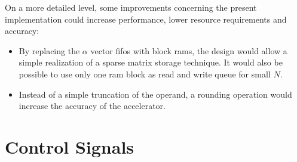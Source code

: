 \documentclass[mscthesis]{usiinfthesis}
\begin{document}
On a more detailed level, some improvements concerning the present
implementation could increase performance, lower resource requirements and
accuracy:
\begin{itemize}
    \item By replacing the $\alpha$ vector \glspl{fifo} with block \glspl{ram},
        the design would allow a simple realization of a sparse matrix storage
        technique. It would also be possible to use only one \gls{ram} block as
        read and write queue for small $N$.
    \item Instead of a simple truncation of the operand, a rounding operation
        would increase the accuracy of the accelerator.
\end{itemize}

\nocite{*}

\appendix %

\chapter{Control Signals}
\end{document}
